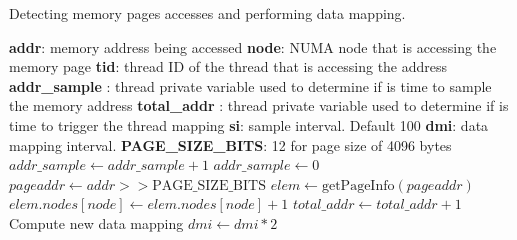 \begin{algorithm}[ht]
	\caption{Detecting memory pages accesses and performing data mapping.}\label{alg:commAndDataMap}
	\begin{algorithmic}[1]
		\Require
		\Statex \textbf{addr}: memory address being accessed
		\Statex \textbf{node}: NUMA node that is accessing the memory page				
		\Statex \textbf{tid}: thread ID of the thread that is accessing the address
		\Statex \textbf{addr\_sample} : thread private variable used to determine if is time to sample the memory address
		\Statex \textbf{total\_addr} : thread private variable used to determine if is time to trigger the thread mapping
		\Statex \textbf{si}: sample interval. Default 100
		\Statex \textbf{dmi}: data mapping interval. 
		\Statex \textbf{PAGE\_SIZE\_BITS}: 12 for page size of 4096 bytes
		\Statex
		\State $addr\_sample \gets addr\_sample + 1$ \label{alg3:incsample}
		  \label{alg3:samplegreater}
		\State $addr\_sample \gets 0$ \label{alg3:zerosample}
		\State $pageaddr \gets addr >> \text{PAGE\_SIZE\_BITS}$  \label{alg3:shiftaddr} 
		\State $elem \gets \text{getPageInfo}(pageaddr)$ \label{alg3:elem}
		  \label{alg3:moved}
		\State $elem.nodes[node]  \gets elem.nodes[node] +1$ \label{alg3:increaseAcc}	
		\EndIf
		\EndIf
		 \label{alg3:isthreadone}
		\State $total\_addr \gets total\_addr + 1$ \label{alg3:inctotaladdr}
		\EndIf
		 \label{alg3:istimetomap}
		\State Compute new data mapping \label{alg3:triggerdatamapping}
		\State $dmi \gets dmi * 2$ \label{alg3:increasedmi}
		\EndIf
	\end{algorithmic}
\end{algorithm}

